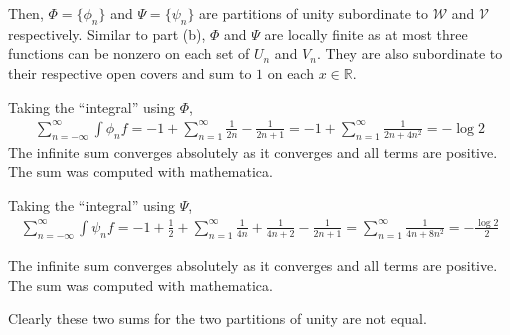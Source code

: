 \documentclass{exam}
\numberwithin{equation}{section}
\newcommand{\R}{\mathbb{R}}
\begin{document}
\begin{enumerate}[label=(\alph*)]
        Then, $\Phi=\{\phi_n\}$ and $\Psi=\{\psi_n\}$ are partitions of unity subordinate to $\mathcal{W}$ and $\mathcal{V}$ respectively. Similar to part (b), $\Phi$ and $\Psi$ are locally finite as at most three functions can be nonzero on each set of $U_n$ and $V_n$. They are also subordinate to their respective open covers and sum to $1$ on each $x\in\R$.
        
        Taking the ``integral'' using $\Phi$,
        \begin{align*}
            \sum_{n=-\infty}^\infty\int\phi_nf=-1+\sum_{n=1}^\infty\frac{1}{2n}-\frac{1}{2n+1}=-1+\sum_{n=1}^\infty\frac{1}{2n+4n^2}=-\log2
        \end{align*}
        The infinite sum converges absolutely as it converges and all terms are positive. The sum was computed with mathematica.
        
        Taking the ``integral'' using $\Psi$,
        \begin{align*}
            \sum_{n=-\infty}^\infty\int\psi_nf=-1+\frac{1}{2}+\sum_{n=1}^\infty\frac{1}{4n}+\frac{1}{4n+2}-\frac{1}{2n+1}=\sum_{n=1}^\infty\frac{1}{4 n + 8 n^2}=-\frac{\log 2}{2}
        \end{align*}

        The infinite sum converges absolutely as it converges and all terms are positive. The sum was computed with mathematica.

        Clearly these two sums for the two partitions of unity are not equal.
    \end{enumerate}
\end{document}

